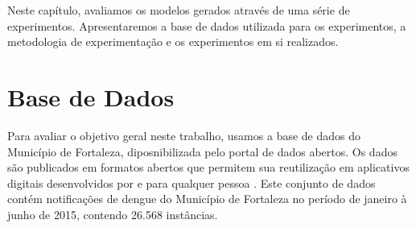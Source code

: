 \documentclass[
	12pt,				%
	openright,			%
	oneside,	
	a4paper,				%
	english,				%
	brazil				%
]{abntex2/abntex2} %
\begin{document}
	Neste capítulo, avaliamos os modelos gerados através de uma série de experimentos. Apresentaremos a base de dados utilizada para os experimentos, a metodologia de experimentação e os experimentos em si realizados.

	\section{Base de Dados}
	
	Para avaliar o objetivo geral neste trabalho, usamos a base de dados  do Município de Fortaleza, diposnibilizada pelo portal de dados abertos. Os dados são publicados em formatos abertos que permitem sua reutilização  em aplicativos digitais desenvolvidos por e para qualquer pessoa \cite{fortaleza:2015}. Este conjunto de dados contém notificações de dengue do Município de Fortaleza no período de janeiro à junho de 2015, contendo 26.568 instâncias. %
\end{document}
